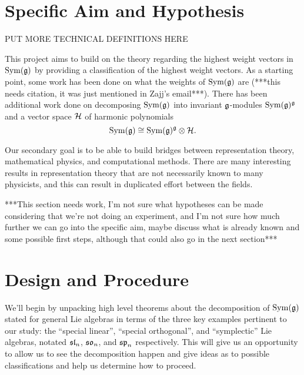 \documentclass[11pt, reqno]{amsart}
\begin{document}

\section{Specific Aim and Hypothesis}

PUT MORE TECHNICAL DEFINITIONS HERE

This project aims to build on the theory regarding the highest weight vectors in $\operatorname{Sym}(\mathfrak{g})$ by providing a classification of the highest weight vectors.  As a starting point, some work has been done on what the weights of $\operatorname{Sym}(\mathfrak{g})$ are (***this needs citation, it was just mentioned in Zajj's email***). There has been additional work done on decomposing $\operatorname{Sym}(\mathfrak{g})$ into invariant $\mathfrak{g}$-modules $\operatorname{Sym}(\mathfrak{g})^{\mathfrak{g}}$ and a vector space $\mathcal{H}$ of harmonic polynomials \cite[(3.10)]{NeRa2004}
\[\operatorname{Sym}(\mathfrak{g})\cong\operatorname{Sym}(\mathfrak{g})^{\mathfrak{g}}\otimes\mathcal{H}.\] 

Our secondary goal is to be able to build bridges between representation theory, mathematical physics, and computational methods. There are many interesting results in representation theory that are not necessarily known to many physicists, and this can result in duplicated effort between the fields.




***This section needs work, I'm not sure what hypotheses can be made considering that we're not doing an experiment, and I'm not sure how much further we can go into the specific aim, maybe discuss what is already known and some possible first steps, although that could also go in the next section***

\section{Design and Procedure}

We'll begin by unpacking high level theorems about the decomposition of $\operatorname{Sym}(\mathfrak{g})$ stated for general Lie algebras in terms of the three key examples pertinent to our study: the ``special linear'', ``special orthogonal'', and ``symplectic'' Lie algebras, notated $\mathfrak{sl}_n$, $\mathfrak{so}_n$, and $\mathfrak{sp}_n$ respectively. This will give us an opportunity to allow us to see the decomposition happen and give ideas as to possible classifications and help us determine how to proceed.
\end{document}
